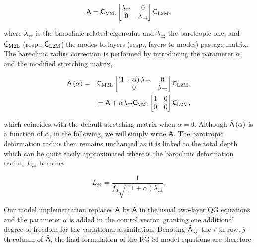 \documentclass[
  draft
]{agujournal2025}
\begin{document}
\begin{equation}
    \mat{A}= \mat{C}_{\mathrm{M2L}}\begin{bmatrix}\lambda_{\rightleftarrows} & 0 \\ 0 & \lambda_{\rightrightarrows}\end{bmatrix}\mat{C}_{\mathrm{L2M}},
\end{equation}

where $\lambda_{\rightleftarrows}$ is the baroclinic-related eigenvalue and $\lambda_{\rightrightarrows}$ the barotropic one, and $\mat{C}_{\mathrm{M2L}}$ (resp., $\mat{C}_{\mathrm{L2M}}$) the modes to layers (resp., layers to modes) passage matrix. The baroclinic radius correction is performed by introducing the parameter $\alpha$, and the modified stretching matrix,

\begin{eqnarray}
    \tilde{\mat{A}}\left(\alpha\right) & = & \mat{C}_{\mathrm{M2L}}\begin{bmatrix}\left(1+\alpha\right)\lambda_{\rightleftarrows} & 0 \\ 0 & \lambda_{\rightrightarrows}\end{bmatrix}\mat{C}_{\mathrm{L2M}}, \\
    && = \mat{A} + \alpha\lambda_{\rightleftarrows}\mat{C}_{\mathrm{M2L}}\begin{bmatrix}1 & 0 \\ 0 & 0\end{bmatrix}\mat{C}_{\mathrm{L2M}},
\end{eqnarray}

which coincides with the default stretching matrix when $\alpha=0$. Although $\tilde{\mat{A}}\left(\alpha\right)$ is a function of $\alpha$, in the following, we will simply write $\tilde{\mat{A}}$. The barotropic deformation radius then remains unchanged as it is linked to the total depth which can be quite easily approximated whereas the baroclinic deformation radius, $L_{\rightleftarrows}$ becomes

\begin{equation}
    L_{\rightleftarrows} = \frac{1}{f_0 \sqrt{\left(1+\alpha\right)\lambda_{\rightleftarrows}}}.
\end{equation}

Our model implementation replaces $\mat{A}$ by $\tilde{\mat{A}}$ in the usual two-layer QG equations and the parameter $\alpha$ is added in the control vector, granting one additional degree of freedom for the variational assimilation. Denoting $\tilde{\mat{A}}_{i,j}$ the $i$-th row, $j$-th column of $\tilde{\mat{A}}$, the final formulation of the RG-SI model equations are therefore
\end{document}
